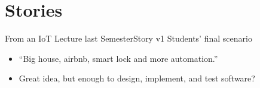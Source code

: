 ﻿\nosectionpage
\section{Stories}
\withsectionpage

\begin{frame}{From an IoT Lecture last Semester}{Story v1}
Students’ final scenario
\begin{itemize}
\item “Big house, airbnb, smart lock and more
automation.”
\item Great idea, but enough to design, implement,
and test software?
\end{itemize}
\end{frame}
